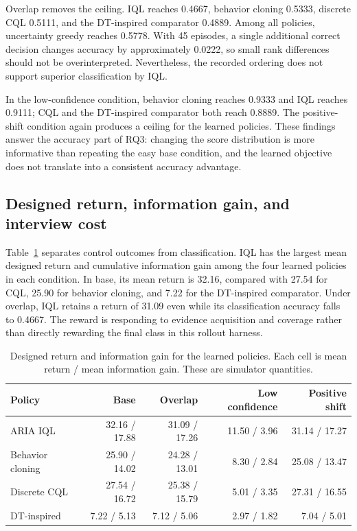 \documentclass[10pt,a4paper]{article}
\begin{document}
Overlap removes the ceiling. IQL reaches 0.4667, behavior cloning 0.5333, discrete CQL 0.5111, and the DT-inspired comparator 0.4889. Among all policies, uncertainty greedy reaches 0.5778. With 45 episodes, a single additional correct decision changes accuracy by approximately 0.0222, so small rank differences should not be overinterpreted. Nevertheless, the recorded ordering does not support superior classification by IQL.

In the low-confidence condition, behavior cloning reaches 0.9333 and IQL reaches 0.9111; CQL and the DT-inspired comparator both reach 0.8889. The positive-shift condition again produces a ceiling for the learned policies. These findings answer the accuracy part of RQ3: changing the score distribution is more informative than repeating the easy base condition, and the learned objective does not translate into a consistent accuracy advantage.

\subsection{Designed return, information gain, and interview cost}
Table~\ref{tab:returns} separates control outcomes from classification. IQL has the largest mean designed return and cumulative information gain among the four learned policies in each condition. In base, its mean return is 32.16, compared with 27.54 for CQL, 25.90 for behavior cloning, and 7.22 for the DT-inspired comparator. Under overlap, IQL retains a return of 31.09 even while its classification accuracy falls to 0.4667. The reward is responding to evidence acquisition and coverage rather than directly rewarding the final class in this rollout harness.

\begin{table}[htbp]
\centering\small
\caption{Designed return and information gain for the learned policies. Each cell is mean return / mean information gain. These are simulator quantities.}
\label{tab:returns}
\begin{tabularx}{\linewidth}{Xrrrr}
\toprule
Policy & Base & Overlap & Low confidence & Positive shift \\ \midrule
ARIA IQL & 32.16 / 17.88 & 31.09 / 17.26 & 11.50 / 3.96 & 31.14 / 17.27 \\
Behavior cloning & 25.90 / 14.02 & 24.28 / 13.01 & 8.30 / 2.84 & 25.08 / 13.47 \\
Discrete CQL & 27.54 / 16.72 & 25.38 / 15.79 & 5.01 / 3.35 & 27.31 / 16.55 \\
DT-inspired & 7.22 / 5.13 & 7.12 / 5.06 & 2.97 / 1.82 & 7.04 / 5.01 \\
\bottomrule
\end{tabularx}
\end{table}
\end{document}
